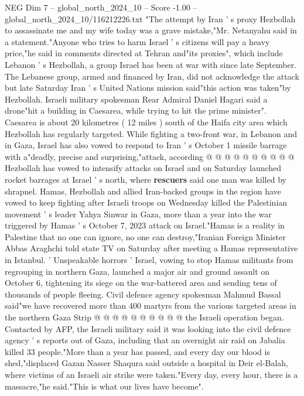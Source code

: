 \begin{textsample}{NEG Dim 7 – global\_north\_2024\_10 – Score -1.00 – global\_north\_2024\_10/116212226.txt}  \label{ex:f7_neg_358}
"The attempt by Iran ' s proxy Hezbollah to assassinate me and my wife today was a grave mistake,"Mr.
Netanyahu said in a statement."Anyone who tries to harm Israel ' s citizens will pay a heavy price,"he said in comments directed at Tehran and"its proxies", which include Lebanon ' s Hezbollah, a group Israel has been at war with since late September.
The Lebanese group, armed and financed by Iran, did not acknowledge the attack but late Saturday Iran ' s United Nations mission said"this action was taken"by Hezbollah.
Israeli military spokesman Rear Admiral Daniel Hagari said a drone"hit a building in Caesarea, while trying to hit the prime minister".
Caesarea is about 20 kilometres ( 12 miles ) south of the Haifa city area which Hezbollah has regularly targeted.
While fighting a two-front war, in Lebanon and in Gaza, Israel has also vowed to respond to Iran ' s October 1 missile barrage with a"deadly, precise and surprising,"attack, according @ @ @ @ @ @ @ @ @ @ Hezbollah has vowed to intensify attacks on Israel and on Saturday launched rocket barrages at Israel ' s north, where \textbf{rescuers} said one man was killed by shrapnel.
Hamas, Hezbollah and allied Iran-backed groups in the region have vowed to keep fighting after Israeli troops on Wednesday killed the Palestinian movement ' s leader Yahya Sinwar in Gaza, more than a year into the war triggered by Hamas ' s October 7, 2023 attack on Israel."Hamas is a reality in Palestine that no one can ignore, no one can destroy,"Iranian Foreign Minister Abbas Araghchi told state TV on Saturday after meeting a Hamas representative in Istanbul. ' Unspeakable horrors ' Israel, vowing to stop Hamas militants from regrouping in northern Gaza, launched a major air and ground assault on October 6, tightening its siege on the war-battered area and sending tens of thousands of people fleeing.
Civil defence agency spokesman Mahmud Bassal said"we have recovered more than 400 martyrs from the various targeted areas in the northern Gaza Strip @ @ @ @ @ @ @ @ @ @ the Israeli operation began.
Contacted by AFP, the Israeli military said it was looking into the civil defence agency ' s reports out of Gaza, including that an overnight air raid on Jabalia killed 33 people."More than a year has passed, and every day our blood is shed,"displaced Gazan Nasser Shaqura said outside a hospital in Deir el-Balah, where victims of an Israeli air strike were taken."Every day, every hour, there is a massacre,"he said."This is what our lives have become".

\end{textsample}
